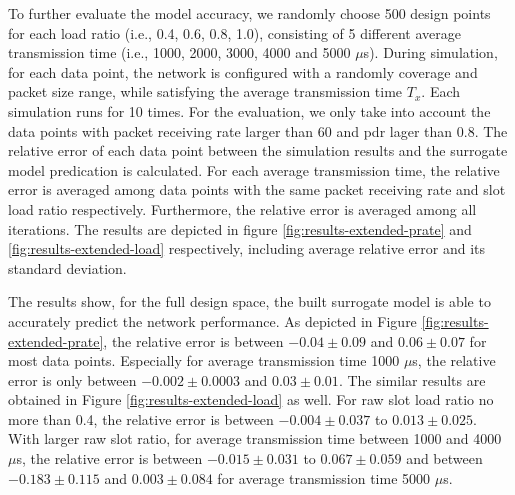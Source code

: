 To further evaluate the model accuracy, we randomly choose 500 design points for each load ratio (i.e., 0.4, 0.6, 0.8, 1.0), consisting of 5 different average transmission time (i.e., 1000, 2000, 3000, 4000 and 5000 $\mu$s). During simulation, for each data point, the network is configured with a randomly coverage and packet size range, while satisfying the average transmission time $T_x$. Each simulation runs for 10 times. For the evaluation, we only take into account the data points with packet receiving rate larger than 60 and \gls{pdr} lager than 0.8. The relative error of each data point between the simulation results and the surrogate model predication is calculated. For each average transmission time, the relative error is averaged among data points with the same packet receiving rate and slot load ratio respectively. Furthermore, the relative error is averaged among all iterations. The results are depicted in figure \ref{fig:results-extended-prate} and \ref{fig:results-extended-load} respectively, including  average relative error and its standard deviation. 



The results show, for the full design space, the built surrogate model is able to accurately predict the network performance. As depicted in Figure \ref{fig:results-extended-prate}, the relative error is between $-0.04 \pm 0.09$  and $0.06 \pm 0.07$ for most data points. Especially for average transmission time 1000 $\mu$s, the relative error is only between $-0.002 \pm 0.0003$ and $0.03 \pm 0.01$. The similar results are obtained in Figure \ref{fig:results-extended-load} as well. For \gls{raw} slot load ratio no more than 0.4, the relative error is between $-0.004 \pm 0.037$ to $0.013 \pm 0.025$. With larger \gls{raw} slot ratio, for average transmission time between 1000 and 4000 $\mu$s, the relative error is between $-0.015 \pm 0.031$ to $0.067 \pm 0.059$ and  between $-0.183 \pm 0.115$ and $0.003 \pm 0.084$ for average transmission time 5000 $\mu$s.

